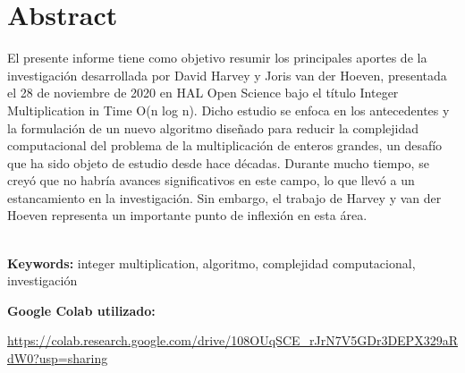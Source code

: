 \chapter*{\center \Large  Abstract}

El presente informe tiene como objetivo resumir los principales aportes de la investigación desarrollada por David Harvey y Joris van der Hoeven, presentada el 28 de noviembre de 2020 en HAL Open Science bajo el título Integer Multiplication in Time O(n log n). Dicho estudio se enfoca en los antecedentes y la formulación de un nuevo algoritmo diseñado para reducir la complejidad computacional del problema de la multiplicación de enteros grandes, un desafío que ha sido objeto de estudio desde hace décadas. Durante mucho tiempo, se creyó que no habría avances significativos en este campo, lo que llevó a un estancamiento en la investigación. Sin embargo, el trabajo de Harvey y van der Hoeven representa un importante punto de inflexión en esta área.

~\\[1cm]
\noindent %
\textbf{Keywords:} integer multiplication, algoritmo, complejidad computacional, investigación

\vfill
\noindent
\textbf{Google Colab utilizado:} 

\url{https://colab.research.google.com/drive/108OUqSCE_rJrN7V5GDr3DEPX329aRdW0?usp=sharing}
